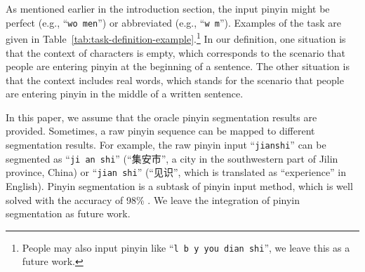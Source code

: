 As mentioned earlier in the introduction section, the input pinyin might be perfect (e.g., ``\texttt{wo men}'') or abbreviated (e.g., ``\texttt{w m}''). Examples of the task are given in Table~\ref{tab:task-definition-example}.\footnote{People may also input pinyin like ``\texttt{l b y you dian shi}'', we leave this as a future work.}
In our definition, one situation is that the context of characters is empty, which corresponds to the scenario that people are entering pinyin at the beginning of a sentence.
The other situation is that the context includes real words, which stands for the scenario that people are entering pinyin in the middle of a written sentence. 

In this paper, we assume that the oracle pinyin segmentation results are provided.
Sometimes, a raw pinyin sequence can be mapped to different segmentation results.
For example, the raw pinyin input ``\texttt{jianshi}'' can be segmented as ``\texttt{ji an shi}'' (``集安市'', a city in the southwestern part of Jilin province, China) or ``\texttt{jian shi}'' (``见识'', which is translated as ``experience'' in English). 
Pinyin segmentation is a subtask \cite{zhao-etal-2006-improved,p2c-seg} of pinyin input method, which is well solved with the accuracy of 98\% \cite{zhang-etal-arxiv-tracing}.
We leave the integration of pinyin segmentation as future work.





